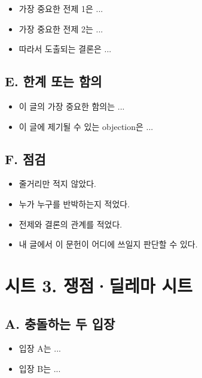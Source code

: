 \begin{itemize}
\tightlist
\item
  가장 중요한 전제 1은 ...
\item
  가장 중요한 전제 2는 ...
\item
  따라서 도출되는 결론은 ...
\end{itemize}

\subsection{E. 한계 또는 함의}\label{e-uxd55cuxacc4-uxb610uxb294-uxd568uxc758}

\begin{itemize}
\tightlist
\item
  이 글의 가장 중요한 함의는 ...
\item
  이 글에 제기될 수 있는 objection은 ...
\end{itemize}

\subsection{F. 점검}\label{f-uxc810uxac80}

\begin{itemize}
\tightlist
\item[$\square$]
  줄거리만 적지 않았다.
\item[$\square$]
  누가 누구를 반박하는지 적었다.
\item[$\square$]
  전제와 결론의 관계를 적었다.
\item[$\square$]
  내 글에서 이 문헌이 어디에 쓰일지 판단할 수 있다.
\end{itemize}

\section{시트 3. 쟁점·딜레마 시트}\label{uxc2dcuxd2b8-3-uxc7c1uxc810uxb51cuxb808uxb9c8-uxc2dcuxd2b8}

\subsection{A. 충돌하는 두 입장}\label{a-uxcda9uxb3ccuxd558uxb294-uxb450-uxc785uxc7a5}

\begin{itemize}
\tightlist
\item
  입장 A는 ...
\item
  입장 B는 ...
\end{itemize}

